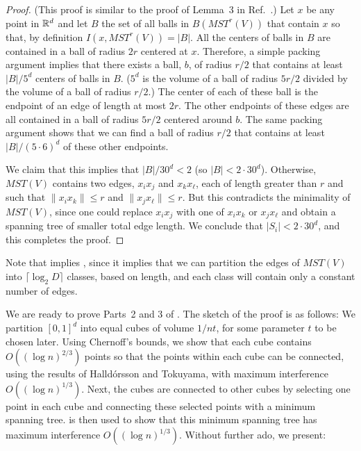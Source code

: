 \documentclass{cccg12}
\newcommand{\mst}{\mathit{MST}}
\begin{document}
\begin{proof}
(This proof is similar to the proof of Lemma~3 in Ref.~\cite{msz11}.)
Let $x$ be any point in $\mathbb{R}^d$ and let $B$ the set of all balls in
$B(\mst^r(V))$ that contain $x$ so that, by definition $I(x,\mst^r(V))=|B|$.
All the centers of balls in $B$ are contained in a ball of radius
$2r$ centered at $x$.  Therefore, a simple packing argument implies
that there exists a ball, $b$, of radius $r/2$ that contains at least
$|B|/5^d$ centers of balls in $B$.  ($5^d$ is the volume of a ball
of radius $5r/2$ divided by the volume of a ball of radius
$r/2$.)  The center of each of these ball is the endpoint of an
edge of length at most $2r$.  The other endpoints of these edges are
all contained in a ball of radius $5r/2$ centered around $b$.  The same
packing argument shows that we can find a ball of radius $r/2$
that contains at least $|B|/(5\cdot 6)^d$ of these other endpoints.


We claim that this implies that $|B|/30^d< 2$ (so $|B|< 2\cdot
30^d$). Otherwise, $\mst(V)$ contains two edges, $x_ix_j$ and $x_kx_\ell$,
each of length greater than $r$ and such that $\|x_ix_k\| \le r$ and
$\|x_jx_\ell\|\le r$.  But this contradicts the minimality of $\mst(V)$,
since one could replace $x_ix_j$ with one of $x_ix_k$ or $x_jx_\ell$
and obtain a spanning tree of smaller total edge length.  We conclude
that $|S_i|< 2\cdot 30^d$, and this completes the proof.
\end{proof}

Note that  implies , since it implies that we
can partition the edges of $\mst(V)$ into $\lceil\log_2 D\rceil$ classes,
based on length, and each class will contain only a constant number of edges.

We are ready to prove Parts~2 and 3 of .  The sketch of the
proof is as follows:  We partition $[0,1]^d$ into equal cubes of volume
$1/nt$, for some parameter $t$ to be chosen later.  Using Chernoff's
bounds, we show that each cube contains $O((\log n)^{2/3})$ points so
that the points within each cube can be connected, using the results of
Halld\'orsson and Tokuyama, with maximum interference $O((\log n)^{1/3})$.
Next, the cubes are connected to other cubes by selecting one point in
each cube and connecting these selected points with a minimum spanning
tree.   is then used to show that this minimum spanning
tree has maximum interference $O((\log n)^{1/3})$.  Without further ado,
we present:
\end{document}
